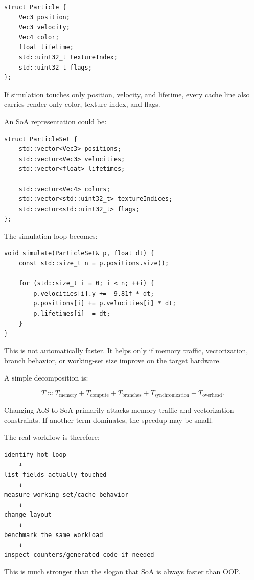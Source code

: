 \begin{verbatim}
struct Particle {
    Vec3 position;
    Vec3 velocity;
    Vec4 color;
    float lifetime;
    std::uint32_t textureIndex;
    std::uint32_t flags;
};
\end{verbatim}

If simulation touches only position, velocity, and lifetime, every cache line also carries render-only color, texture index, and flags.

An SoA representation could be:

\begin{verbatim}
struct ParticleSet {
    std::vector<Vec3> positions;
    std::vector<Vec3> velocities;
    std::vector<float> lifetimes;

    std::vector<Vec4> colors;
    std::vector<std::uint32_t> textureIndices;
    std::vector<std::uint32_t> flags;
};
\end{verbatim}

The simulation loop becomes:

\begin{verbatim}
void simulate(ParticleSet& p, float dt) {
    const std::size_t n = p.positions.size();

    for (std::size_t i = 0; i < n; ++i) {
        p.velocities[i].y += -9.81f * dt;
        p.positions[i] += p.velocities[i] * dt;
        p.lifetimes[i] -= dt;
    }
}
\end{verbatim}

This is not automatically faster. It helps only if memory traffic, vectorization, branch behavior, or working-set size improve on the target hardware.

A simple decomposition is:

\[
T
\approx
T_{\text{memory}}
+
T_{\text{compute}}
+
T_{\text{branches}}
+
T_{\text{synchronization}}
+
T_{\text{overhead}}.
\]

Changing AoS to SoA primarily attacks memory traffic and vectorization constraints. If another term dominates, the speedup may be small.

The real workflow is therefore:

\begin{verbatim}
identify hot loop
    ↓
list fields actually touched
    ↓
measure working set/cache behavior
    ↓
change layout
    ↓
benchmark the same workload
    ↓
inspect counters/generated code if needed
\end{verbatim}

This is much stronger than the slogan that SoA is always faster than OOP.

